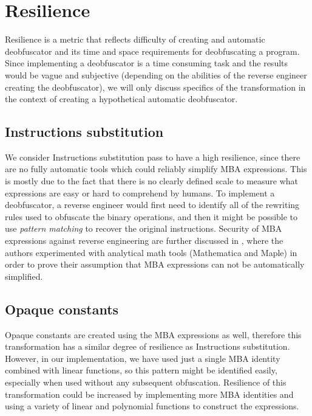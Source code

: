 \documentclass[
  digital, %
  notable,   %
  twoside, %
  nolof,     %
  nolot,     %
]{fithesis3}
\theoremstyle{definition}
\begin{document}
\section{Resilience}

Resilience is a metric that reflects difficulty of creating and automatic deobfuscator and its time and space requirements for deobfuscating a program. Since implementing a deobfuscator is a time consuming task and the results would be vague and subjective (depending on the abilities of the reverse engineer creating the deobfuscator), we will only discuss specifics of the transformation in the context of creating a hypothetical automatic deobfuscator. 

\subsection{Instructions substitution}

We consider Instructions substitution pass to have a high resilience, since there are no fully automatic tools which could reliably simplify MBA expressions. This is mostly due to the fact that there is no clearly defined scale to measure what expressions are easy or hard to comprehend by humans. To implement a deobfuscator, a reverse engineer would first need to identify all of the rewriting rules used to obfuscate the binary operations, and then it might be possible to use \textit{pattern matching} to recover the original instructions. Security of MBA expressions against reverse engineering are further discussed in \cite{mba_zhou}, where the authors experimented with analytical math tools (Mathematica and Maple) in order to prove their assumption that MBA expressions can not be automatically simplified. 

\subsection{Opaque constants}

Opaque constants are created using the MBA expressions as well, therefore this transformation has a similar degree of resilience as Instructions substitution. However, in our implementation, we have used just a single MBA identity combined with linear functions, so this pattern might be identified easily, especially when used without any subsequent obfuscation. Resilience of this transformation could be increased by implementing more MBA identities and using a variety of linear and polynomial functions to construct the expressions. 
\end{document}
